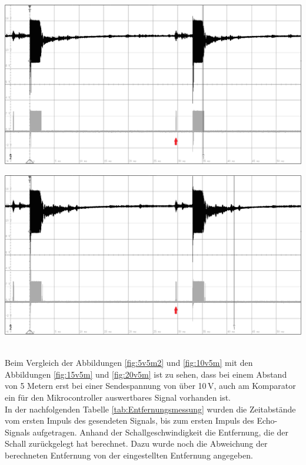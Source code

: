 \begin{minipage}{0.46\textwidth}
\includegraphics[width=1\textwidth%
]{Abbildungen/MessungenP2/15V/5mb.PNG}
\label{fig:15v5m}
\end{minipage}\qquad
\begin{minipage}{0.46\textwidth}
\includegraphics[width=1\textwidth%
]{Abbildungen/MessungenP2/20V/5mb.PNG}
\label{fig:20v5m}
\end{minipage}\\
Beim Vergleich der Abbildungen \ref{fig:5v5m2} und \ref{fig:10v5m} mit den Abbildungen \ref{fig:15v5m} und \ref{fig:20v5m}  ist zu sehen, dass bei einem Abstand von 5 Metern erst bei einer Sendespannung von über 10\,V, auch am Komparator ein für den Mikrocontroller auswertbares Signal vorhanden ist. \\
In der nachfolgenden Tabelle \ref{tab:Entfernungsmessung} wurden die Zeitabstände vom ersten Impuls des gesendeten Signals, bis zum ersten Impuls des Echo-Signals aufgetragen. Anhand der Schallgeschwindigkeit die Entfernung, die der Schall zurückgelegt hat berechnet. Dazu wurde noch die Abweichung der berechneten Entfernung von der eingestellten Entfernung angegeben.\\


